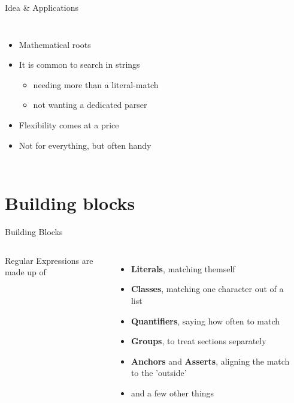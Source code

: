\documentclass[english,aspectratio=169]{beamer}
\begin{document}
\begin{frame}{Idea \& Applications}

\begin{columns}
        \begin{itemize}
        \item Mathematical roots
        \item It is common to search in strings
        \begin{itemize}
        \item needing more than a literal-match
        \item not wanting a dedicated parser
        \end{itemize}
        \item Flexibility comes at a price
        \item Not for everything, but often handy
        \end{itemize}
        \begin{center}
        \end{center}
    \end{columns}
\end{frame}

\section{Building blocks}
\begin{frame}{Building Blocks}
\begin{columns}
        Regular Expressions are made up of
        \begin{itemize}
            \item \textbf{Literals}, matching themself
            \item \textbf{Classes}, matching one character out of a list
            \item \textbf{Quantifiers}, saying how often to match
            \item \textbf{Groups}, to treat sections separately
            \item \textbf{Anchors} and \textbf{Asserts}, aligning the match to the 'outside'
            \item and a few other things
        \end{itemize}
        \begin{center}
        \end{center}
\end{columns}
\end{frame}
\end{document}
